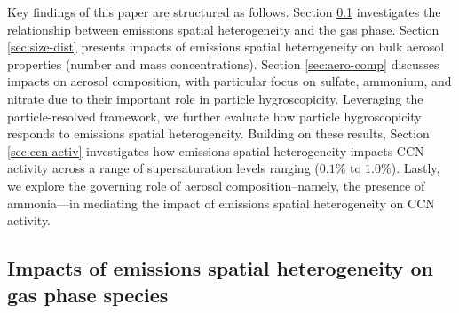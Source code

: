 \documentclass[journal abbreviation, manuscript]{copernicus}
\begin{document}
Key findings of this paper are structured as follows. Section
\ref{sec:gas-impacts} investigates the relationship between emissions
spatial heterogeneity and the gas phase. Section \ref{sec:size-dist}
presents impacts of emissions spatial heterogeneity on bulk aerosol
properties (number and mass concentrations). Section
\ref{sec:aero-comp} discusses impacts on aerosol composition, with
particular focus on sulfate, ammonium, and nitrate due to their
important role in particle hygroscopicity. Leveraging the
particle-resolved framework, we further evaluate how particle
hygroscopicity responds to emissions spatial heterogeneity. Building
on these results, Section \ref{sec:ccn-activ} investigates how
emissions spatial heterogeneity impacts CCN activity across a range of
supersaturation levels ranging ($0.1\%$ to $1.0\%$). Lastly, we
explore the governing role of aerosol composition--namely, the
presence of ammonia---in mediating the impact of emissions spatial
heterogeneity on CCN activity.

\subsection{Impacts of emissions spatial heterogeneity on gas phase species}\label{sec:gas-impacts}
\end{document}
